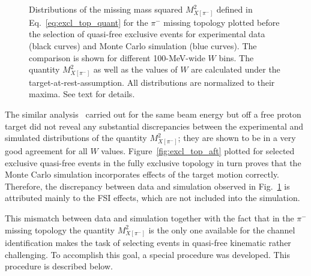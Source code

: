 \begin{figure}[!ht]
\begin{center}
\end{center}
\caption{\small Distributions of the missing mass squared $M^{2}_{X[\pi^{-}]}$ defined in Eq.~\eqref{eq:excl_top_quant} for the $\pi^{-}$ missing topology plotted before the selection of quasi-free exclusive events for experimental data (black curves) and Monte Carlo simulation (blue curves). The comparison is shown for different 100-MeV-wide $W$ bins. The quantity $M^{2}_{X[\pi^{-}]}$ as well as the values of $W$ are calculated under the target-at-rest-assumption. All distributions are normalized to their maxima. See text for details. }
\label{fig:main_top_mm2}
\end{figure}

The similar analysis~\cite{Fed_an_note:2017} carried out for the same beam energy but off a free proton target did not reveal any substantial discrepancies between the experimental and simulated distributions of the quantity $M_{X[\pi^{-}]}^{2}$; they are shown to be in a very good agreement for all $W$ values. Figure~\ref{fig:excl_top_aft} plotted for selected exclusive quasi-free events in the fully exclusive topology in turn proves that the Monte Carlo simulation incorporates effects of the target motion correctly. Therefore, the discrepancy between data and simulation observed in Fig.~\ref{fig:main_top_mm2} is attributed mainly to the FSI effects, which are not included into the simulation.

This mismatch between data and simulation together with the fact that in the $\pi^{-}$ missing topology the quantity $M_{X[\pi^{-}]}^{2}$ is the only one available for the channel identification makes the task of selecting events in quasi-free kinematic rather challenging. To accomplish this goal, a special procedure was developed. This procedure is described below. 

